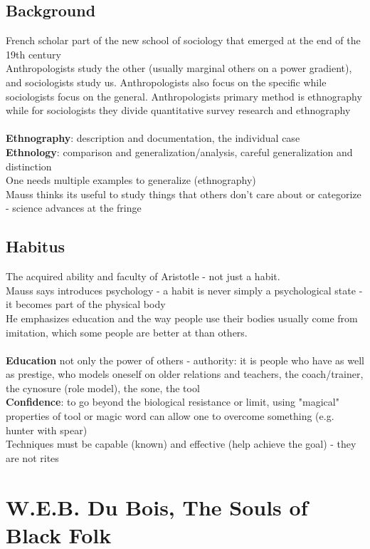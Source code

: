 \documentclass{article}
\begin{document}
\subsection{Background}
French scholar part of the new school of sociology that emerged at the end of the 19th century \\
Anthropologists study the other (usually marginal others on a power gradient), and sociologists study us. Anthropologists also focus on the specific while sociologists focus on the general. Anthropologists primary method is ethnography while for sociologists they divide quantitative survey research and ethnography \\ \\
\textbf{Ethnography}: description and documentation, the individual case \\ 
\textbf{Ethnology}: comparison and generalization/analysis, careful generalization and distinction \\
One needs multiple examples to generalize (ethnography) \\
Mauss thinks its useful to study things that others don't care about or categorize - science advances at the fringe 

\subsection{Habitus}
The acquired ability and faculty of Aristotle - not just a habit.  \\
Mauss says introduces psychology  - a habit is never simply a psychological state - it becomes part of the physical body \\
He emphasizes education and the way people use their bodies usually come from imitation, which some people are better at than others. \\ \\ 
\textbf{Education} not only the power of others - authority: it is people who have as well as prestige, who models oneself on older relations and teachers, the coach/trainer, the cynosure (role model), the sone, the tool \\ 
\textbf{Confidence}: to go beyond the biological resistance or limit, using "magical" properties of tool or magic word can allow one to overcome something (e.g. hunter with spear) \\
Techniques must be capable (known) and effective (help achieve the goal) - they are not rites 

\section{W.E.B. Du Bois, The Souls of Black Folk}
\end{document}
